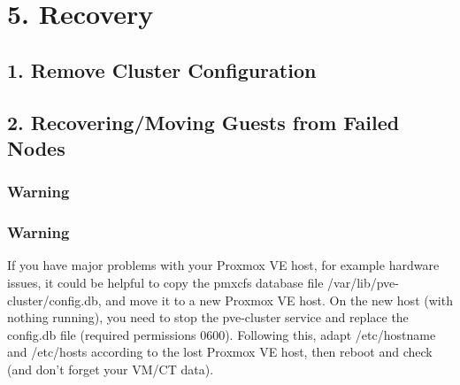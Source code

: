 \begin{table}[htbp]

\centering

\begin{tabular}

\end{tabular}

\end{table}

\begin{table}[htbp]

\centering

\begin{tabular}

\end{tabular}

\end{table}

\begin{table}[htbp]

\centering

\begin{tabular}

\end{tabular}

\end{table}


\section{5. Recovery}

\subsection{1. Remove Cluster Configuration}

\subsection{2. Recovering/Moving Guests from Failed Nodes}

\subsubsection{Warning}

\subsubsection{Warning}

If you have major problems with your Proxmox VE host, for example hardware issues, it could be helpful to copy the pmxcfs database file /var/lib/pve-cluster/config.db, and move it to a new Proxmox VE host. On the new host (with nothing running), you need to stop the pve-cluster service and replace the config.db file (required permissions 0600). Following this, adapt /etc/hostname and /etc/hosts according to the lost Proxmox VE host, then reboot and check (and don’t forget your VM/CT data).

